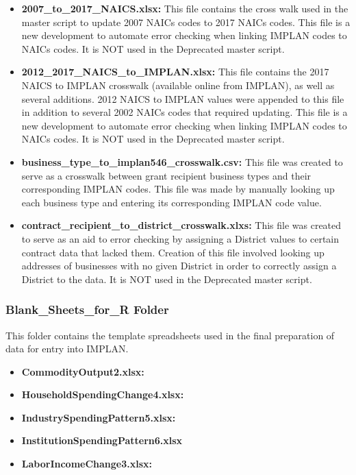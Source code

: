 \documentclass[
]{book}
\providecommand{\tightlist}{%
  \setlength{\itemsep}{0pt}\setlength{\parskip}{0pt}}
\begin{document}
\begin{itemize}
\tightlist
\item
  \textbf{2007\_to\_2017\_NAICS.xlsx:} This file contains the cross walk used in the master script to update 2007 NAICs codes to 2017 NAICs codes. This file is a new development to automate error checking when linking IMPLAN codes to NAICs codes. It is NOT used in the Deprecated master script.
\item
  \textbf{2012\_2017\_NAICS\_to\_IMPLAN.xlsx:} This file contains the 2017 NAICS to IMPLAN crosswalk (available online from IMPLAN), as well as several additions. 2012 NAICS to IMPLAN values were appended to this file in addition to several 2002 NAICs codes that required updating. This file is a new development to automate error checking when linking IMPLAN codes to NAICs codes. It is NOT used in the Deprecated master script.
\item
  \textbf{business\_type\_to\_implan546\_crosswalk.csv:} This file was created to serve as a crosswalk between grant recipient business types and their corresponding IMPLAN codes. This file was made by manually looking up each business type and entering its corresponding IMPLAN code value.
\item
  \textbf{contract\_recipient\_to\_district\_crosswalk.xlxs:} This file was created to serve as an aid to error checking by assigning a District values to certain contract data that lacked them. Creation of this file involved looking up addresses of businesses with no given District in order to correctly assign a District to the data. It is NOT used in the Deprecated master script.
\end{itemize}

\hypertarget{blank_sheets_for_r-folder}{%
\subsubsection{Blank\_Sheets\_for\_R Folder}\label{blank_sheets_for_r-folder}}

This folder contains the template spreadsheets used in the final preparation of data for entry into IMPLAN.

\begin{itemize}
\tightlist
\item
  \textbf{CommodityOutput2.xlsx:}
\item
  \textbf{HouseholdSpendingChange4.xlsx:}
\item
  \textbf{IndustrySpendingPattern5.xlsx:}
\item
  \textbf{InstitutionSpendingPattern6.xlsx}
\item
  \textbf{LaborIncomeChange3.xlsx:}
\end{itemize}
\end{document}
